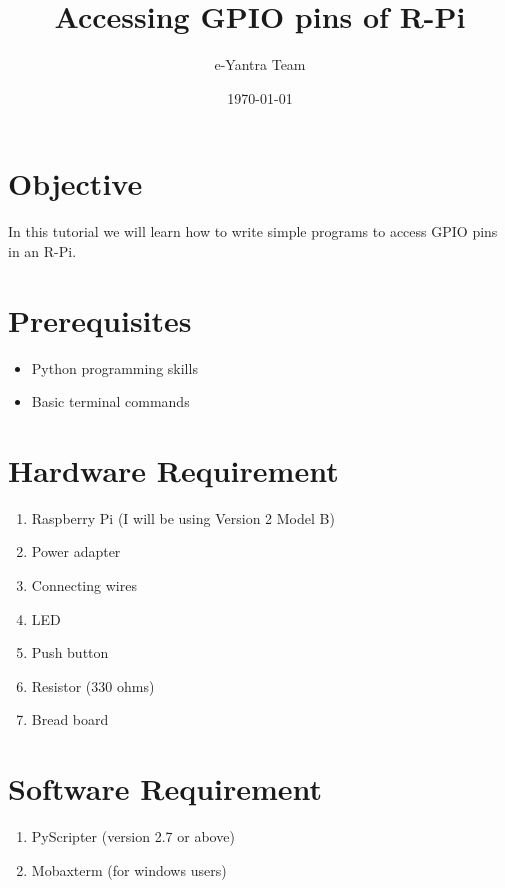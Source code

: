 \documentclass[11pt,a4paper]{article}
\title{Accessing GPIO pins of R-Pi}
\author{e-Yantra Team}
\date{\today}
\begin{document}
	\maketitle
	\newpage
	\tableofcontents
	\newpage
	\section{Objective}
	In this tutorial we will learn how to write simple programs to access GPIO pins in an R-Pi. 
	\section{Prerequisites}
	\begin{itemize}
		\item Python programming skills
		\item Basic terminal commands
	\end{itemize}
	\section{Hardware Requirement}
	\begin{enumerate}
		\item Raspberry Pi (I will be using Version 2 Model B)
		\item Power adapter
		\item Connecting wires
		\item LED
		\item Push button
		\item Resistor (330 ohms)
		\item Bread board
	\end{enumerate}
	\section{Software Requirement}
	\begin{enumerate}
		\item PyScripter (version 2.7 or above)
		\item Mobaxterm (for windows users)
	\end{enumerate}
	
	\newpage
\end{document}
